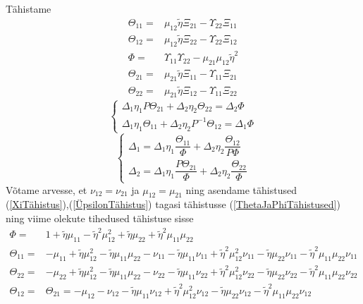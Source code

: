 \documentclass[class=article, crop=false]{standalone}
\begin{document}
Tähistame
\begin{equation}\label{ThetaJaPhiTähistused}
	\begin{split}
		\Theta_{11} = & \mu_{12} \tilde{ \eta} \Xi_{21} - \Upsilon_{22} \Xi_{11} \\
		\Theta_{12} = & \mu_{12} \tilde{ \eta} \Xi_{22} - \Upsilon_{22} \Xi_{12} \\
		\Phi = & \Upsilon_{11} \Upsilon_{22} - \mu_{21} \mu_{12} \tilde{ \eta}^{2} \\
		\Theta_{21} = & \mu_{21} \tilde{ \eta} \Xi_{11} - \Upsilon_{11} \Xi_{21} \\
		\Theta_{22} = & \mu_{21} \tilde{ \eta} \Xi_{12} - \Upsilon_{11} \Xi_{22}
	\end{split}
\end{equation}
\begin{equation}\label{key}
	\begin{cases}
		\Delta_{1} \eta_{ 1} P \Theta_{21} + \Delta_{2} \eta_{ 2} \Theta_{22} = \Delta_{2} \Phi \\
		\Delta_{1} \eta_{ 1} \Theta_{11} + \Delta_{2} \eta_{ 2} P^{-1} \Theta_{12} = \Delta_{1} \Phi
	\end{cases}
\end{equation}
\begin{equation}\label{key}
	\begin{cases}
		\Delta_{1} = \Delta_{1} \eta_{ 1} \dfrac{ \Theta_{11}}{ \Phi} + \Delta_{2} \eta_{ 2} \dfrac{ \Theta_{12}}{P \Phi} \\
		\Delta_{2} = \Delta_{1} \eta_{ 1} \dfrac{ P \Theta_{21}}{ \Phi} + \Delta_{2} \eta_{ 2} \dfrac{ \Theta_{22}}{ \Phi}
	\end{cases}
\end{equation}
Võtame arvesse, et $ \nu_{12} = \nu_{21} $ ja $  \mu_{12} = \mu_{21} $ ning asendame tähistused (\ref{XiTähistus}),(\ref{ÜpsilonTähistus}) tagasi tähistusse (\ref{ThetaJaPhiTähistused}) ning viime olekute tihedused tähistuse sisse
\begin{equation}\label{key}
	\begin{split}
		\Phi = & 1 + \tilde{ \eta} \mu_{11} - \tilde{ \eta}^{2} \mu_{12}^{2} + \tilde{ \eta} \mu_{22} + \tilde{ \eta}^{2} \mu_{11} \mu_{22} \\
		\Theta_{11} = & - \mu_{11} + \tilde{ \eta} \mu_{12}^{2} - \tilde{ \eta} \mu_{11} \mu_{22} - \nu_{11} - \tilde{ \eta} \mu_{11} \nu_{11} + \tilde{ \eta}^{2} \mu_{12}^{2} \nu_{11} - \tilde{ \eta} \mu_{22} \nu_{11} - \tilde{ \eta}^{2} \mu_{11} \mu_{22} \nu_{11} \\
		\Theta_{22} = & - \mu_{22} + \tilde{ \eta} \mu_{12}^{2} - \tilde{ \eta} \mu_{11} \mu_{22} - \nu_{22} - \tilde{ \eta} \mu_{11} \nu_{22} + \tilde{ \eta}^{2} \mu_{12}^{2} \nu_{22} - \tilde{ \eta} \mu_{22} \nu_{22} - \tilde{ \eta}^{2} \mu_{11} \mu_{22} \nu_{22} \\
		\Theta_{12} = & \Theta_{21} = - \mu_{12} - \nu_{12} - \tilde{ \eta} \mu_{11} \nu_{12} + \tilde{ \eta}^{2} \mu_{12}^{2} \nu_{12} - \tilde{ \eta} \mu_{22} \nu_{12} - \tilde{ \eta}^{2} \mu_{11} \mu_{22} \nu_{12}
	\end{split}
\end{equation}
\end{document}
